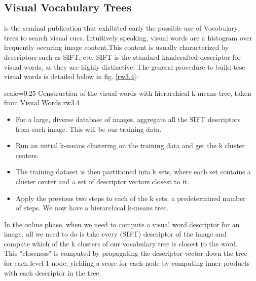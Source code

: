 
\subsection{Visual Vocabulary Trees} %

\cite{Nister2006} is the seminal publication that exhibited early the possible use of Vocabulary trees to search visual cues. Intuitively speaking, visual words are a histogram over frequently occuring image content.This content is usually characterized by descriptors such as SIFT, etc.
SIFT is the standard handcrafted descriptor for visual words, as they are highly distinctive. The general procedure to build tese visual words is detailed below in fig. \ref{rw3.4}:

{scale=0.25}%
{Construction of the visual words with hierarchical k-means tree, taken from \cite{Nister2006}}%
{Visual Words}%
{rw3.4} %

\begin{itemize}
	\item For a large, diverse database of images, aggregate all the SIFT descriptors from each image. This will be our training data.\\
	\item Run an initial k-means clustering on the training data and get the k cluster centers.\\
	\item The training dataset is then partitioned into k sets, where each set contains a cluster center and a set of descriptor vectors closest to it.\\
	\item Apply the previous two steps to each of the k sets, a predetermined number of steps. We now have a hierarchical k-means tree.\\
\end{itemize}

In the online phase, when we need to compute a visual word descriptor for an image, all we need to do is take every (SIFT) descriptor of the image and compute 
which of the k clusters of our vocabulary tree is closest to the word. This "closeness" is computed by propagating the descriptor vector down the tree for each 
level-1 node, yielding a score for each node by computing inner products with each descriptor in the tree.

